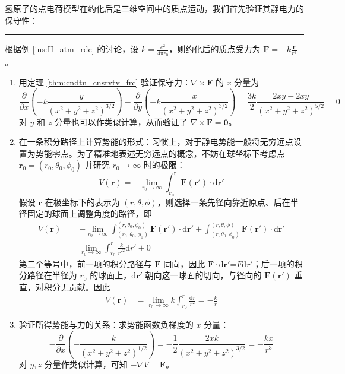 \documentclass[cn,10pt,math=newtx,citestyle=gb7714-2015,bibstyle=gb7714-2015]{elegantbook}
\def\bm{\boldsymbol}
\def\d{\mathrm d}
\def\p{\partial}
\def\ra{\rightarrow}
\def\srule{\noindent\rule{\linewidth}{0.3mm}}
\begin{document}
氢原子的点电荷模型在约化后是三维空间中的质点运动，我们首先验证其静电力的保守性：

\srule

\begin{instance}[静电势]\label{ins:Clmb_ptntl}
根据例 \ref{ins:H_atm_rdc} 的讨论，设 $k=\frac{e^2}{4\pi\epsilon_0}$，则约化后的质点受力为 $\bm F=-k\frac{\bm r}{r^3}$。

\begin{enumerate}
    \item 用定理 \ref{thm:cndtn_cnsrvtv_frc} 验证保守力：$\nabla\times\bm F$ 的 $x$ 分量为
\begin{equation*}
    \frac{\p}{\p x}\left(-k\frac{y}{\left(x^2+y^2+z^2\right)^{3/2}}\right) - \frac{\p}{\p y}\left(-k\frac{x}{\left(x^2+y^2+z^2\right)^{3/2}}\right)  = \frac{3k}{2}\frac{2xy-2xy}{\left(x^2+y^2+z^2\right)^{5/2}} = 0
\end{equation*}
对 $y$ 和 $z$ 分量也可以作类似计算，从而验证了 $\nabla\times\bm F=\bm 0$。

    \item 在一条积分路径上计算势能的形式：习惯上，对于静电势能一般将无穷远点设置为势能零点。为了精准地表述无穷远点的概念，不妨在球坐标下考虑点 $\bm r_0 = (r_0,\theta_0,\phi_0)$ 并研究 $r_0\ra\infty$ 时的极限：
\begin{equation*}
    V(\bm r) = -\lim_{r_0\ra\infty}\int_{\bm r_0}^{\bm r} \bm F(\bm r')\cdot\d\bm r'
\end{equation*}
假设 $\bm r$ 在极坐标下的表示为 $(r,\theta,\phi)$，则选择一条先径向靠近原点、后在半径固定的球面上调整角度的路径，即
\begin{align*}
    V(\bm r) &= -\lim_{r_0\ra\infty}\int_{(r_0,\theta_0,\phi_0)}^{(r,\theta_0,\phi_0)} \bm F(\bm r')\cdot\d\bm r' + \int_{(r,\theta_0,\phi_0)}^{(r,\theta,\phi)} \bm F(\bm r')\cdot\d\bm r'\\
    &= \lim_{r_0\ra\infty}\int_{r_0}^r \frac{k}{r'^2}\d r' + 0
\end{align*}
第二个等号中，前一项的积分路径与 $\bm F$ 同向，因此 $\bm F\cdot\d\bm r'$=$F\d r'$；后一项的积分路径在半径为 $r_0$ 的球面上，$\d\bm r'$ 朝向这一球面的切向，与径向的 $\bm F(\bm r')$ 垂直，对积分无贡献。因此
\begin{align*}
    V(\bm r) &= \lim_{r_0\ra\infty}k\int_{r_0}^r\frac{\d r}{r^2} = -\frac{k}{r}
\end{align*}

    \item 验证所得势能与力的关系：求势能函数负梯度的 $x$ 分量：
\begin{equation*}
    -\frac{\p}{\p x}\left(-\frac{k}{\left(x^2+y^2+z^2\right)^{1/2}}\right) = -\frac{1}{2}\frac{2xk}{\left(x^2+y^2+z^2\right)^{3/2}} = -\frac{kx}{r^3}
\end{equation*}
对 $y,z$ 分量作类似计算，可知 $-\nabla V=\bm F$。
\end{enumerate}
\end{instance}
\end{document}
